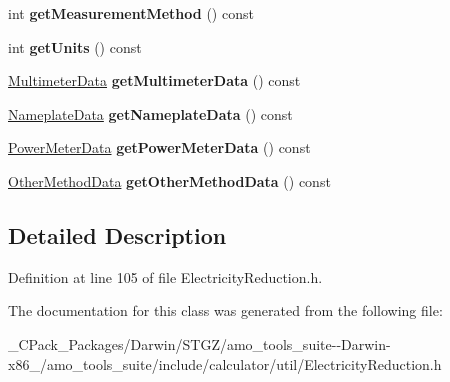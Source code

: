 \begin{DoxyCompactItemize}
int {\bfseries get\+Measurement\+Method} () const
\item 
\mbox{\label{class_electricity_reduction_input_a146159d4cac2232f7ef29e4b2ac58327}} 
int {\bfseries get\+Units} () const
\item 
\mbox{\label{class_electricity_reduction_input_a2a68f5f0b38e54aee9dfcf3ab490d07d}} 
\hyperlink{class_multimeter_data}{Multimeter\+Data} {\bfseries get\+Multimeter\+Data} () const
\item 
\mbox{\label{class_electricity_reduction_input_a2d63fc41d86ea60fe16389bab1b4ac09}} 
\hyperlink{class_nameplate_data}{Nameplate\+Data} {\bfseries get\+Nameplate\+Data} () const
\item 
\mbox{\label{class_electricity_reduction_input_a4ba54572c92951231af9c506d3f494e7}} 
\hyperlink{class_power_meter_data}{Power\+Meter\+Data} {\bfseries get\+Power\+Meter\+Data} () const
\item 
\mbox{\label{class_electricity_reduction_input_a9963ea6b61ac8bb57026e3e2c7d307ca}} 
\hyperlink{class_other_method_data}{Other\+Method\+Data} {\bfseries get\+Other\+Method\+Data} () const
\end{DoxyCompactItemize}


\subsection{Detailed Description}


Definition at line 105 of file Electricity\+Reduction.\+h.



The documentation for this class was generated from the following file\+:\begin{DoxyCompactItemize}
\item 
\+\_\+\+C\+Pack\+\_\+\+Packages/\+Darwin/\+S\+T\+G\+Z/amo\+\_\+tools\+\_\+suite-\/-\/\+Darwin-\/x86\+\_/amo\+\_\+tools\+\_\+suite/include/calculator/util/Electricity\+Reduction.\+h\end{DoxyCompactItemize}
